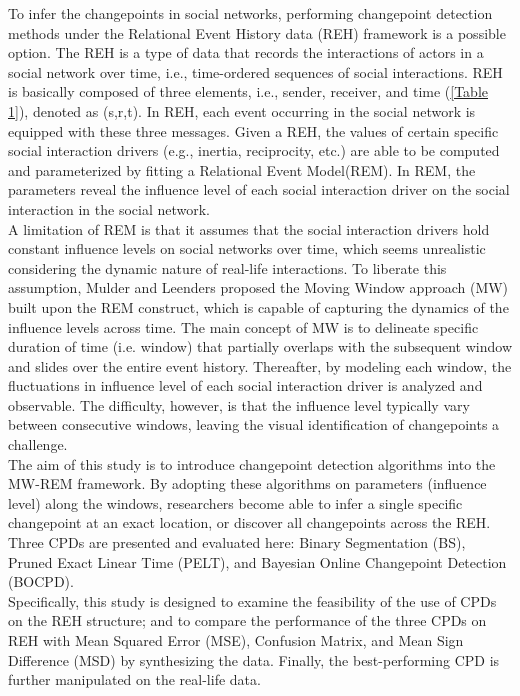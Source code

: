 \documentclass[]{interact}
\theoremstyle{plain}%
\theoremstyle{definition}
\theoremstyle{remark}
\begin{document}
To infer the changepoints in social networks, performing changepoint detection methods under the Relational Event History data (REH) framework is a possible option. The REH is a type of data that records the interactions of actors in a social network over time, i.e., time-ordered sequences of social interactions\cite{meijerink-bosmanDynamicRelationalEvent2022}. REH is basically composed of three elements, i.e., sender, receiver, and time (\autoref{Table 1}), denoted as (s,r,t). In REH, each event occurring in the social network is equipped with these three messages. Given a REH, the values of certain specific social interaction drivers (e.g., inertia, reciprocity, etc.) are able to be computed and parameterized by fitting a Relational Event Model(REM). In REM, the parameters reveal the influence level of each social interaction driver on the social interaction in the social network.\\

A limitation of REM is that it assumes that the social interaction drivers hold constant influence levels on social networks over time, which seems unrealistic considering the dynamic nature of real-life interactions. To liberate this assumption, Mulder and Leenders \cite{mulderModelingEvolutionInteraction2019} proposed the Moving Window approach (MW) built upon the REM construct, which is capable of capturing the dynamics of the influence levels across time. The main concept of MW is to delineate specific duration of time (i.e. window) that partially overlaps with the subsequent window and slides over the entire event history. Thereafter, by modeling each window, the fluctuations in influence level of each social interaction driver is analyzed and observable. The difficulty, however, is that the influence level typically vary between consecutive windows, leaving the visual identification of changepoints a challenge.\\

The aim of this study is to introduce changepoint detection algorithms into the MW-REM framework. By adopting these algorithms on parameters (influence level) along the windows, researchers become able to infer a single specific changepoint at an exact location, or discover all changepoints across the REH. Three CPDs are presented and evaluated here: Binary Segmentation (BS), Pruned Exact Linear Time (PELT), and Bayesian Online Changepoint Detection (BOCPD).\\

Specifically, this study is designed to examine the feasibility of the use of CPDs on the REH structure; and to compare the performance of the three CPDs on REH with Mean Squared Error (MSE), Confusion Matrix, and Mean Sign Difference (MSD) by synthesizing the data. Finally, the best-performing CPD is further manipulated on the real-life data.\\
\end{document}
